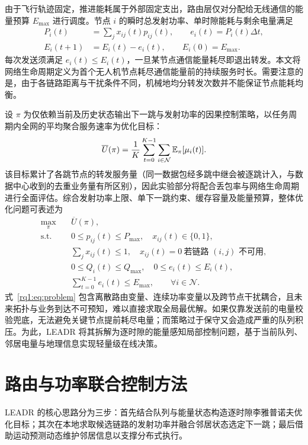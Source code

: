 由于飞行轨迹固定，推进能耗属于外部固定支出，路由层仅对分配给无线通信的能量预算 $E_{\max}$ 进行调度。节点 $i$ 的瞬时总发射功率、单时隙能耗与剩余电量满足
\begin{align}
 P_i(t)&=\sum_j x_{ij}(t)p_{ij}(t),\qquad e_i(t)=P_i(t)\Delta t,
 \label{rq1:eq:power_total}\\
 E_i(t+1)&=E_i(t)-e_i(t),\qquad E_i(0)=E_{\max}.
 \label{rq1:eq:energy_update}
\end{align}
每次发送须满足 $e_i(t)\le E_i(t)$，一旦某节点通信能量耗尽即退出转发。本文将网络生命周期定义为首个无人机节点耗尽通信能量前的持续服务时长。需要注意的是，由于各链路距离与干扰条件不同，机械地均分转发次数并不能保证节点能耗均衡。

设 $\pi$ 为仅依赖当前及历史状态输出下一跳与发射功率的因果控制策略，以任务周期内全网的平均聚合服务速率为优化目标：
\begin{equation}
 \overline{U}(\pi)=\frac{1}{K}\sum_{t=0}^{K-1}
                 \sum_{i\in\mathcal{N}}\mathbb{E}_{\pi}[\mu_i(t)].
 \label{rq1:eq:utility}
\end{equation}
该目标累计了各跳节点的转发服务量（同一数据包经多跳中继会被逐跳计入，与数据中心收到的去重业务量有所区别），因此实验部分将配合丢包率与网络生命周期进行全面评估。综合发射功率上限、单下一跳约束、缓存容量及能量预算，整体优化问题可表述为
\begin{align}
 \max_{\pi}\quad &\overline{U}(\pi),\label{rq1:eq:problem}\\
 \text{s.t.}\quad
 &0\le p_{ij}(t)\le P_{\max},\quad x_{ij}(t)\in\{0,1\},\nonumber\\
 &\sum_jx_{ij}(t)\le1,\quad x_{ij}(t)=0\ \text{若链路 $(i,j)$ 不可用},\nonumber\\
 &0\le Q_i(t)\le Q_{\max},\quad 0\le e_i(t)\le E_i(t),\nonumber\\
 &\sum_{t=0}^{K-1}e_i(t)\le E_{\max},\qquad \forall i\in\mathcal{N}.\nonumber
\end{align}
式~\eqref{rq1:eq:problem} 包含离散路由变量、连续功率变量以及跨节点干扰耦合，且未来拓扑与业务到达不可预知，难以直接求取全局最优解。如果仅靠发送前的电量校验兜底，无法避免关键节点提前耗尽电量；而策略过于保守又会造成严重的队列积压。为此，LEADR 将其拆解为逐时隙的能量感知局部控制问题，基于当前队列、邻居电量与地理信息实现轻量级在线决策。

\section{路由与功率联合控制方法}
\label{rq1:sec:algorithm}

LEADR 的核心思路分为三步：首先结合队列与能量状态构造逐时隙李雅普诺夫优化目标；其次在本地求取候选链路的发射功率并融合邻居状态选定下一跳；最后借助运动预测动态维护邻居信息以支撑分布式执行。

